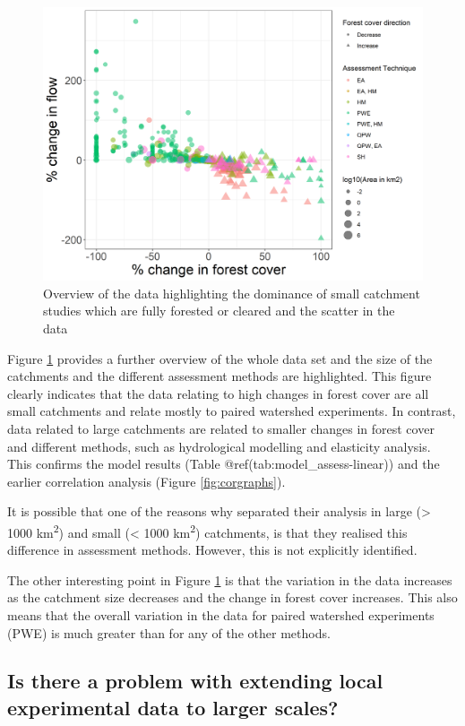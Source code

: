 \documentclass[]{elsarticle} %
\begin{document}
\begin{figure}
\includegraphics[width=0.9\linewidth]{flow_forest_byArea} \caption{Overview of the data highlighting the dominance of small catchment studies which are fully forested or cleared and the scatter in the data}\label{fig:overview}
\end{figure}

Figure \ref{fig:overview} provides a further overview of the whole data set and the size of the catchments and the different assessment methods are highlighted. This figure clearly indicates that the data relating to high changes in forest cover are all small catchments and relate mostly to paired watershed experiments. In contrast, data related to large catchments are related to smaller changes in forest cover and different methods, such as hydrological modelling and elasticity analysis. This confirms the model results (Table @ref(tab:model\_assess-linear)) and the earlier correlation analysis (Figure \ref{fig:corgraphs}).

It is possible that one of the reasons why \citet{zhang2017} separated their analysis in large (\textgreater{} 1000 km\textsuperscript{2}) and small (\textless{} 1000 km\textsuperscript{2}) catchments, is that they realised this difference in assessment methods. However, this is not explicitly identified.

The other interesting point in Figure \ref{fig:overview} is that the variation in the data increases as the catchment size decreases and the change in forest cover increases. This also means that the overall variation in the data for paired watershed experiments (PWE) is much greater than for any of the other methods.

\hypertarget{is-there-a-problem-with-extending-local-experimental-data-to-larger-scales}{%
\subsection{Is there a problem with extending local experimental data to larger scales?}\label{is-there-a-problem-with-extending-local-experimental-data-to-larger-scales}}
\end{document}
